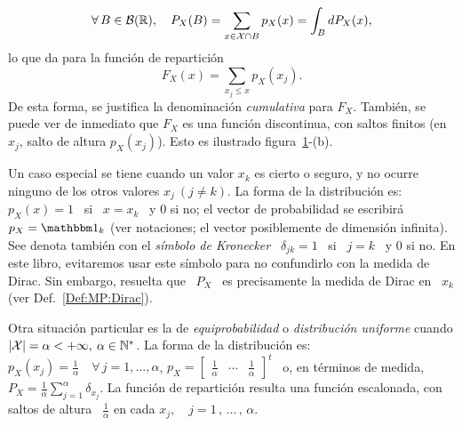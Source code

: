 %
\[
\forall \,  B \in  \mathcal{B}(\mathbb{R}), \quad  P_X(B) = \sum_{x  \in \mathcal{X}  \cap B}  p_X(x) =
\int_B dP_X(x),
\]
%
lo que da para la funci\'on de repartici\'on
%
\[
F_X(x) = \sum_{x_j \le x} p_X(x_j).
\]
%
De  esta forma,  se justifica  la  denominaci\'on {\it  cumulativa} para  $F_X$.
Tambi\'en, se puede ver de inmediato que $F_X$ es una funci\'on discontinua, con
saltos  finitos (en  $x_j$,  salto  de altura  $p_X(x_j)$).   Esto es  ilustrado
figura~\ref{Fig:MP:ProbaDiscreta}-(b).

\begin{figure}[h!]
\begin{center}  \end{center}
%
\label{Fig:MP:ProbaDiscreta}
\end{figure}

Un caso especial se tiene cuando un  valor $x_k$ es cierto o seguro, y no ocurre
ninguno de los  otros valores $x_j \  (j \ne k)$. La forma  de la distribuci\'on
es:  \ $p_X(x)  = 1$  \  si \  $x =  x_k$  \ y  $0$ si  no;  el vector  de
probabilidad  se escribir\'a  \ $p_X  = \un_k$ 
(ver notaciones; el vector posiblemente  de dimensi\'on infinita).
See denota tambi\'en  con el {\it s\'imbolo de Kronecker} \  $\delta_{jk} = 1$ \
si \ $j = k$ \ y 0 si  no. En este libro, evitaremos usar este s\'imbolo para no
confundirlo  con la medida  de Dirac.  Sin embargo,  resuelta que  \ $P_X$  \ es
precisamente la medida de Dirac en \ $x_k$ (ver Def.~\ref{Def:MP:Dirac}).


Otra   situaci\'on  particular   es  la   de  {\it   equiprobabilidad}   o  {\it
  distribuci\'on  uniforme} cuando  $|\mathcal{X}|  =  \alpha <  +\infty,  \: \alpha  \in
\mathbb{N}^*$.  La  forma de la distribuci\'on  es: \ $p_X(x_j)  = \frac1\alpha \quad
\forall \, j =  1 , \ldots , \alpha$, \ie $p_X  = \begin{bmatrix} \frac1\alpha &
  \cdots &  \frac1\alpha \end{bmatrix}^t$ \ o,  en t\'erminos de  medida, $P_X =
\frac1\alpha  \sum_{j=1}^\alpha \delta_{x_j}$.   La  funci\'on de  repartici\'on
resulta una funci\'on escalonada, con  saltos de altura \ $\frac1\alpha$ en cada
$x_j, \quad j = 1 \, , \, \ldots \, , \, \alpha$.

